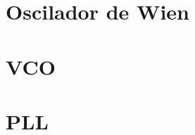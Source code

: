 







\tableofcontents
\newpage

\section{Oscilador de Wien}
	
	
\section{VCO}	
		
	
\section{PLL}
	
	

